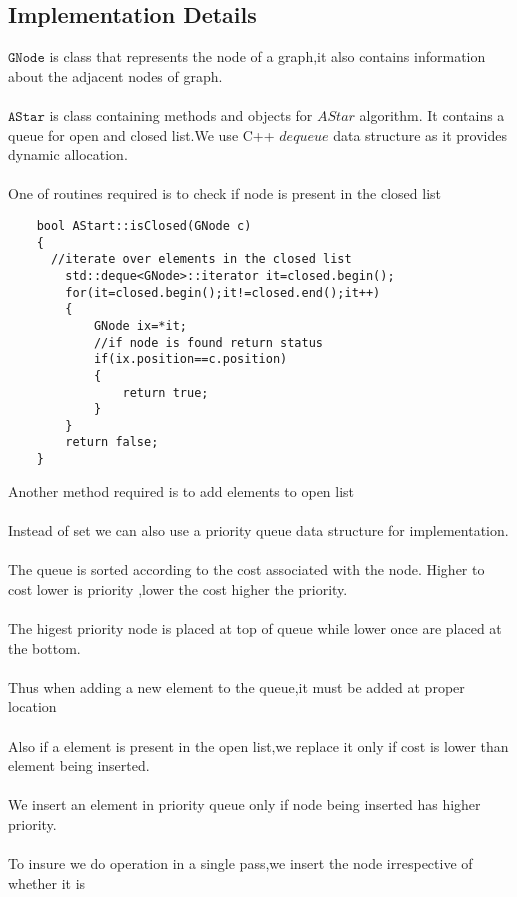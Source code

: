 \documentclass[fontsize=12pt, %
                             paper=a4, %
                             oneside, %
                             captions=tableheading,
                             index=totoc,
                             hyperref]{labbook}
\begin{document}
\subsection{Implementation Details}
$\texttt{GNode}$  is class that represents the node of a graph,it
also contains information about the adjacent nodes of graph.
\\\\
$\texttt{AStar}$ is class containing methods and objects for $AStar$ algorithm.
It contains a queue for open and closed list.We use C++ $dequeue$ data structure
as it provides dynamic allocation.
\\\\
One of routines required is to check if node is present in the closed list
\begin{verbatim}
    bool AStart::isClosed(GNode c)
    {
      //iterate over elements in the closed list
        std::deque<GNode>::iterator it=closed.begin();
        for(it=closed.begin();it!=closed.end();it++)
        {
            GNode ix=*it;
            //if node is found return status
            if(ix.position==c.position)
            {
                return true;
            }
        }
        return false;
    } 
\end{verbatim}
Another method required is to add elements to open list
\\\\
Instead of set we can also use a priority queue data structure for implementation.
\\\\
The queue is sorted according to the cost associated with the node.
Higher to cost lower is priority ,lower the cost higher the priority.
\\\\
The higest priority node is placed at top of queue while lower once
are placed at the bottom.
\\\\
Thus when adding a new element to the queue,it must be added at proper location
\\\\
Also if a element is present in the open list,we replace it only if cost is lower
than element being inserted.
\\\\
We insert an element in priority queue only if node being inserted has higher priority.
\\\\
To insure we do operation in a single pass,we insert the node irrespective of whether it is
\end{document}
